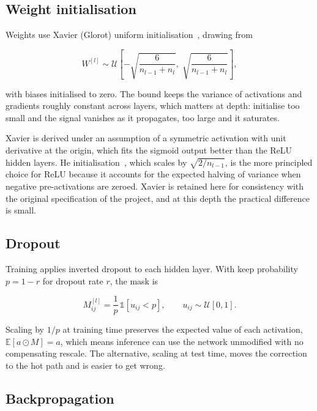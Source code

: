 \documentclass[11pt,a4paper]{article}
\begin{document}
\subsection{Weight initialisation}

Weights use Xavier (Glorot) uniform initialisation~\cite{glorot}, drawing from

\begin{equation}
W^{[l]} \sim \mathcal{U}\!\left[
-\sqrt{\frac{6}{n_{l-1}+n_l}},\;
\sqrt{\frac{6}{n_{l-1}+n_l}}
\right],
\end{equation}

with biases initialised to zero. The bound keeps the variance of activations and
gradients roughly constant across layers, which matters at depth: initialise too
small and the signal vanishes as it propagates, too large and it saturates.

Xavier is derived under an assumption of a symmetric activation with unit
derivative at the origin, which fits the sigmoid output better than the ReLU
hidden layers. He initialisation~\cite{he}, which scales by $\sqrt{2/n_{l-1}}$,
is the more principled choice for ReLU because it accounts for the expected
halving of variance when negative pre-activations are zeroed. Xavier is retained
here for consistency with the original specification of the project, and at this
depth the practical difference is small.

\subsection{Dropout}
\label{sec:dropout}

Training applies inverted dropout to each hidden layer. With keep probability
$p = 1 - r$ for dropout rate $r$, the mask is

\begin{equation}
M^{[l]}_{ij} = \frac{1}{p}\,\mathbb{1}\!\left[u_{ij} < p\right],
\qquad u_{ij} \sim \mathcal{U}[0,1].
\end{equation}

Scaling by $1/p$ at training time preserves the expected value of each
activation, $\mathbb{E}[a \odot M] = a$, which means inference can use the
network unmodified with no compensating rescale. The alternative, scaling at test
time, moves the correction to the hot path and is easier to get wrong.

\subsection{Backpropagation}
\end{document}
